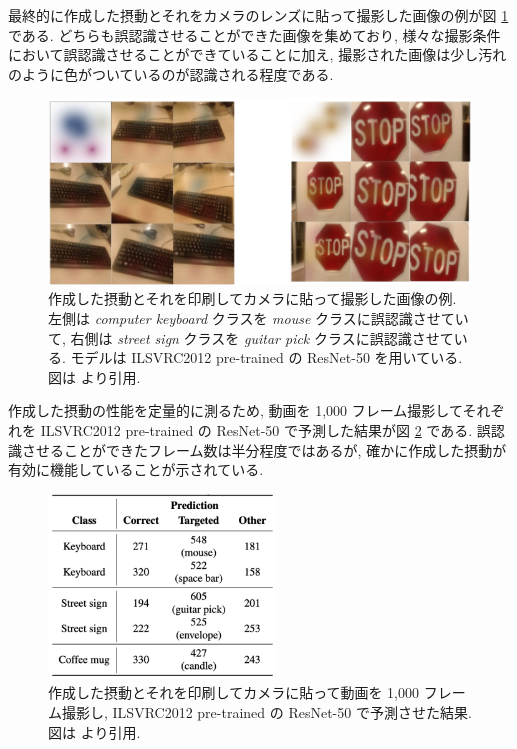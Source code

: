 最終的に作成した摂動とそれをカメラのレンズに貼って撮影した画像の例が図 \ref{fig:adversarial-camera-example} である.
どちらも誤認識させることができた画像を集めており, 様々な撮影条件において誤認識させることができていることに加え, 撮影された画像は少し汚れのように色がついているのが認識される程度である.
%
\begin{figure}[htbp]
\begin{center}
\includegraphics[width=12.0cm]{figures/adversarial-camera-example.pdf}
\end{center}
\caption{
作成した摂動とそれを印刷してカメラに貼って撮影した画像の例.
左側は {\it computer keyboard} クラスを {\it mouse} クラスに誤認識させていて, 右側は {\it street sign} クラスを {\it guitar pick} クラスに誤認識させている.
モデルは ILSVRC2012 pre-trained の ResNet-50 を用いている.
図は \cite{li2019adversarial} より引用.
}
\label{fig:adversarial-camera-example}
\end{figure}
%

作成した摂動の性能を定量的に測るため, 動画を 1,000 フレーム撮影してそれぞれを ILSVRC2012 pre-trained の ResNet-50 で予測した結果が図 \ref{fig:adversarial-camera-fool-ratio} である.
誤認識させることができたフレーム数は半分程度ではあるが, 確かに作成した摂動が有効に機能していることが示されている.
%
\begin{figure}[htbp]
\begin{center}
\includegraphics[width=6.0cm]{figures/adversarial-camera-fool-ratio.pdf}
\end{center}
\caption{
作成した摂動とそれを印刷してカメラに貼って動画を 1,000 フレーム撮影し, ILSVRC2012 pre-trained の ResNet-50 で予測させた結果.
図は \cite{li2019adversarial} より引用.
}
\label{fig:adversarial-camera-fool-ratio}
\end{figure}
%

